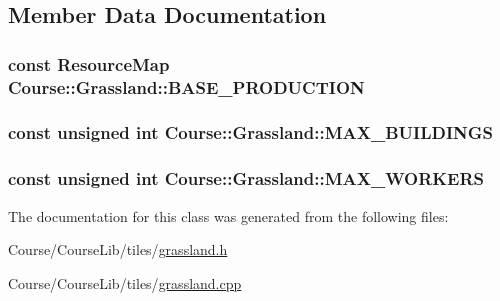 \subsection{Member Data Documentation}
\hypertarget{classCourse_1_1Grassland_a35a3ec14967c6b7446caa94887e33524}{
\subsubsection[{B\-A\-S\-E\-\_\-\-P\-R\-O\-D\-U\-C\-T\-I\-O\-N}]{\setlength{\rightskip}{0pt plus 5cm}const {\bf Resource\-Map} Course\-::\-Grassland\-::\-B\-A\-S\-E\-\_\-\-P\-R\-O\-D\-U\-C\-T\-I\-O\-N\hspace{0.3cm}{\ttfamily [static]}}}\label{classCourse_1_1Grassland_a35a3ec14967c6b7446caa94887e33524}
\hypertarget{classCourse_1_1Grassland_aa90f673331e9c748a5960c513c27cdd9}{
\subsubsection[{M\-A\-X\-\_\-\-B\-U\-I\-L\-D\-I\-N\-G\-S}]{\setlength{\rightskip}{0pt plus 5cm}const unsigned int Course\-::\-Grassland\-::\-M\-A\-X\-\_\-\-B\-U\-I\-L\-D\-I\-N\-G\-S\hspace{0.3cm}{\ttfamily [static]}}}\label{classCourse_1_1Grassland_aa90f673331e9c748a5960c513c27cdd9}
\hypertarget{classCourse_1_1Grassland_af92733b817010370c0540d1631b6f486}{
\subsubsection[{M\-A\-X\-\_\-\-W\-O\-R\-K\-E\-R\-S}]{\setlength{\rightskip}{0pt plus 5cm}const unsigned int Course\-::\-Grassland\-::\-M\-A\-X\-\_\-\-W\-O\-R\-K\-E\-R\-S\hspace{0.3cm}{\ttfamily [static]}}}\label{classCourse_1_1Grassland_af92733b817010370c0540d1631b6f486}


The documentation for this class was generated from the following files\-:\begin{DoxyCompactItemize}
\item 
Course/\-Course\-Lib/tiles/\hyperlink{grassland_8h}{grassland.\-h}\item 
Course/\-Course\-Lib/tiles/\hyperlink{grassland_8cpp}{grassland.\-cpp}\end{DoxyCompactItemize}
